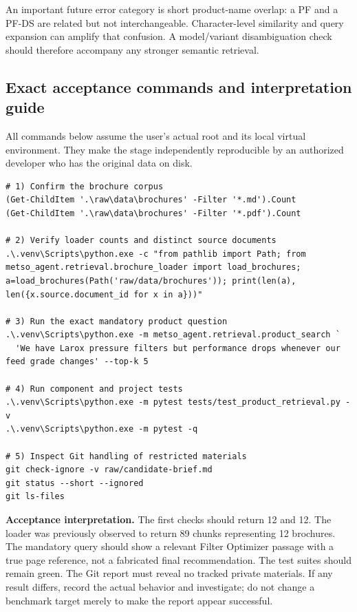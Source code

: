 \documentclass[11pt,a4paper]{article}
\DeclareRobustCommand{\code}[1]{{\ttfamily\small\detokenize{#1}}}
\begin{document}
An important future error category is short product-name overlap: a PF and a PF-DS are related but not interchangeable. Character-level similarity and query expansion can amplify that confusion. A model/variant disambiguation check should therefore accompany any stronger semantic retrieval.

\subsection{Exact acceptance commands and interpretation guide}
All commands below assume the user's actual \code{interview/project} root and its local virtual environment. They make the stage independently reproducible by an authorized developer who has the original data on disk.

\begin{Verbatim}[fontsize=\footnotesize]
# 1) Confirm the brochure corpus
(Get-ChildItem '.\raw\data\brochures' -Filter '*.md').Count
(Get-ChildItem '.\raw\data\brochures' -Filter '*.pdf').Count

# 2) Verify loader counts and distinct source documents
.\.venv\Scripts\python.exe -c "from pathlib import Path; from metso_agent.retrieval.brochure_loader import load_brochures; a=load_brochures(Path('raw/data/brochures')); print(len(a), len({x.source.document_id for x in a}))"

# 3) Run the exact mandatory product question
.\.venv\Scripts\python.exe -m metso_agent.retrieval.product_search `
  'We have Larox pressure filters but performance drops whenever our feed grade changes' --top-k 5

# 4) Run component and project tests
.\.venv\Scripts\python.exe -m pytest tests/test_product_retrieval.py -v
.\.venv\Scripts\python.exe -m pytest -q

# 5) Inspect Git handling of restricted materials
git check-ignore -v raw/candidate-brief.md
git status --short --ignored
git ls-files
\end{Verbatim}

\textbf{Acceptance interpretation.} The first checks should return 12 and 12. The loader was previously observed to return 89 chunks representing 12 brochures. The mandatory query should show a relevant Filter Optimizer passage with a true page reference, not a fabricated final recommendation. The test suites should remain green. The Git report must reveal no tracked private materials. If any result differs, record the actual behavior and investigate; do not change a benchmark target merely to make the report appear successful.
\end{document}
